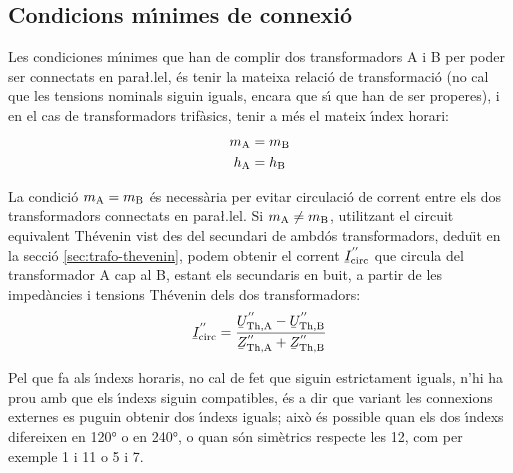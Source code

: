 \subsection{Condicions m\'{\i}nimes de connexi\'{o}}

Les condiciones m\'{\i}nimes que han de complir dos transformadors A i B per poder ser connectats en para{\l.l}el, \'{e}s tenir la mateixa relaci\'{o} de transformaci\'{o} (no cal que les tensions nominals siguin iguals, encara que s\'{\i} que han de ser properes), i en el cas de transformadors trif\`{a}sics, tenir a m\'{e}s el mateix \'{\i}ndex horari:
\begin{align}
    m_\mathrm{A} &= m_\mathrm{B}\\
    h_\mathrm{A} &= h_\mathrm{B}
\end{align}

La condici\'{o} $m_\mathrm{A} = m_\mathrm{B}$ \'{e}s necess\`{a}ria per evitar circulaci\'{o} de corrent entre els dos transformadors connectats en para{\l.l}el. Si $m_\mathrm{A} \neq m_\mathrm{B}$, utilitzant el circuit equivalent  Th\'{e}venin vist des del secundari de ambd\'{o}s transformadors, dedu\"{\i}t en la secci\'{o} \vref{sec:trafo-thevenin}, podem obtenir el corrent $\cmplx{I}\ped{circ}^{''}$ que circula del transformador A cap al B, estant els secundaris en buit, a partir de les imped\`{a}ncies i tensions Th\'{e}venin dels dos transformadors:
\begin{equation}
    \cmplx{I}\ped{circ}^{''} = \frac{\cmplx{U}\ped{Th,A}^{''}-\cmplx{U}\ped{Th,B}^{''}}{\cmplx{Z}\ped{Th,A}^{''}+\cmplx{Z}\ped{Th,B}^{''}}
\end{equation}

Pel que fa als \'{\i}ndexs horaris, no cal de fet que siguin estrictament iguals, n'hi ha prou amb que els \'{\i}ndexs siguin compatibles, \'{e}s a dir que variant les connexions externes es puguin obtenir dos \'{\i}ndexs iguals; aix\`{o} \'{e}s possible quan els dos \'{\i}ndexs difereixen en \ang{120} o en \ang{240}, o quan s\'{o}n sim\`{e}trics respecte les 12, com per exemple 1 i 11 o 5 i 7.


